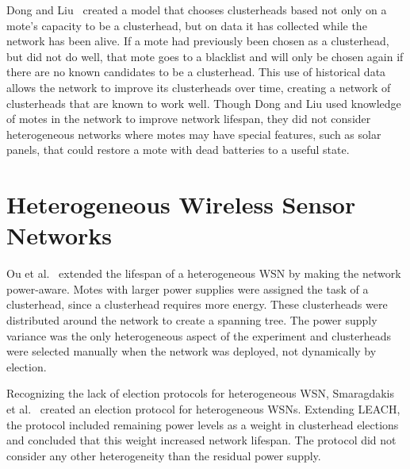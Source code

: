 Dong and Liu~\cite{resilient} created a model that chooses clusterheads based 
not only on a mote's capacity to be a clusterhead, but on data it has 
collected while the network has been alive.  If a mote had previously been 
chosen as a clusterhead, but did not do well, that mote goes to a blacklist 
and will only be chosen again if there are no known candidates to 
be a clusterhead. This use of historical data allows the network to improve 
its clusterheads over time, creating a network of clusterheads that are known 
to work well. Though Dong and Liu used knowledge of motes in the network to 
improve network lifespan, they did not consider heterogeneous networks where 
motes may have special features, such as solar panels, that could restore a 
mote with dead batteries to a useful state.

  

\section{Heterogeneous Wireless Sensor Networks}

Ou et al.~\cite{powerawareoverlay}  extended the lifespan of a heterogeneous 
WSN by making the network power-aware. Motes with larger power supplies were 
assigned the task of a clusterhead, since a clusterhead  requires more energy.  
These clusterheads were distributed around the network to create a spanning 
tree.  The power supply variance was the only heterogeneous aspect of the 
experiment and clusterheads were selected manually when the network was 
deployed, not dynamically by election.

Recognizing the lack of election protocols for heterogeneous WSN,  Smaragdakis 
et al.~\cite{stableElection} created an election protocol for heterogeneous 
WSNs.  Extending LEACH, the protocol included remaining power levels as a 
weight in clusterhead elections and concluded that this weight increased 
network lifespan.  The protocol did not  consider any other heterogeneity than 
the residual power supply. 

